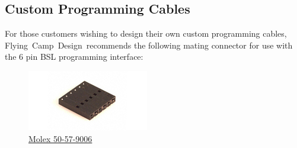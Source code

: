 \documentclass[10pt,letterpaper]{datasheet}
\newcommand{\fcd}{Flying~Camp~Design}
\begin{document}
\begin{flushleft}
\subsection*{Custom Programming Cables}
  For those customers wishing to design their own custom programming cables, \fcd\ recommends the following mating connector for use with the 6 pin BSL programming interface:

  \begin{figure}[!h]
    \label{fig:50-57-9006}
    \begin{center}
      \includegraphics[width=2 in]{50-57-9006_sml}
    \end{center}
    \caption{\href{http://www.molex.com/pdm_docs/sd/050579006_sd.pdf}%
                  {Molex 50-57-9006}}
  \end{figure}

\end{flushleft}

\newpage
\end{document}
